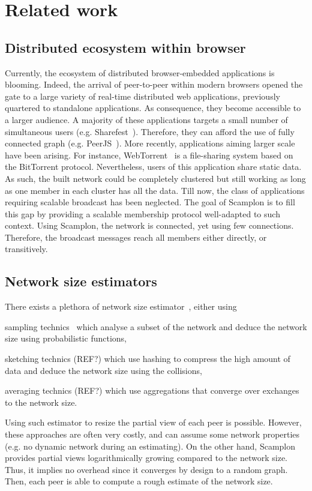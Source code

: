 
\section{Related work}
\label{sec:relatedwork}

\subsection{Distributed ecosystem within browser}
Currently, the ecosystem of distributed browser-embedded applications is
blooming. Indeed, the arrival of peer-to-peer within modern browsers opened the
gate to a large variety of real-time distributed web applications, previously
quartered to standalone applications. As consequence, they become accessible to
a larger audience. A majority of these applications targets a small number of
simultaneous users (e.g. Sharefest~\cite{sharefest}). Therefore, they can
afford the use of fully connected graph (e.g. PeerJS~\cite{peerjs}). More
recently, applications aiming larger scale have been arising. For instance,
WebTorrent~\cite{webtorrent} is a file-sharing system based on the BitTorrent
protocol. Nevertheless, users of this application share static data. As such,
the built network could be completely clustered but still working as long as
one member in each cluster has all the data.  Till now, the class of
applications requiring scalable broadcast has been neglected. The goal of
Scamplon is to fill this gap by providing a scalable membership protocol
well-adapted to such context. Using Scamplon, the network is connected, yet
using few connections. Therefore, the broadcast messages reach all members
either directly, or transitively.


\subsection{Network size estimators}
There exists a plethora of network size
estimator~\cite{kostoulas2007active,baquero2012extrema}, either using
\begin{inparaenum}[(i)]
\item sampling technics~\cite{kostoulas2007active} which analyse a subset of
  the network and deduce the network size using probabilistic functions,
\item sketching technics (REF?) which use hashing to compress the high amount
  of data and deduce the network size using the collisions,
\item averaging technics (REF?) which use aggregations that converge over
  exchanges to the network size.
\end{inparaenum}
Using such estimator to resize the partial view of each peer is
possible. However, these approaches are often very costly, and can assume some
network properties (e.g. no dynamic network during an estimating). On the other
hand, Scamplon provides partial views logarithmically growing compared to the
network size. Thus, it implies no overhead since it converges by design to a
random graph. Then, each peer is able to compute a rough estimate of the
network size.

